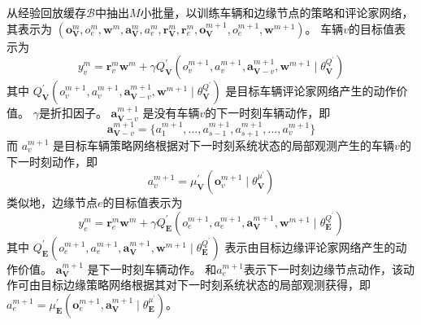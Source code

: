从经验回放缓存$\mathcal{B}$中抽出$M$小批量，以训练车辆和边缘节点的策略和评论家网络，其表示为 $\left(\boldsymbol{o}_{\mathbf{V}}^{m}, {o}_{e}^{m}, \boldsymbol{w}^{m}, \boldsymbol{a}_{\mathbf{V}}^{m}, {a}_{e}^{m}, \boldsymbol{r}_{\mathbf{V}}^{m}, \boldsymbol{r}_{e}^{m}, \boldsymbol{o}_{\mathbf{V}}^{m+1}, {o}_{e}^{m+1}, \boldsymbol{w}^{m+1}\right)$。
车辆$v$的目标值表示为
\begin{equation}
	y_{v}^{m} = \boldsymbol{r}_{v}^{m} \boldsymbol{w}^{m} +\gamma Q_{\mathbf{V}}^{\prime}\left({o}_{v}^{m+1},  {a}_{v}^{m+1}, \boldsymbol{a}_{\boldsymbol{\mathbf{V}}-v}^{m+1}, \boldsymbol{w}^{m+1} \mid \theta_{\mathbf{V}}^{Q^{\prime}} \right)
\end{equation}
\noindent 其中 $Q_{\mathbf{V}}^{\prime}({o}_{v}^{m+1},  {a}_{v}^{m+1}, \boldsymbol{a}_{\boldsymbol{\mathbf{V}}-v}^{m+1}, \boldsymbol{w}^{m+1} \mid \theta_{\mathbf{V}}^{Q^{\prime}})$ 是目标车辆评论家网络产生的动作价值。
$\gamma$是折扣因子。
$\boldsymbol{a}_{\boldsymbol{\mathbf{V}}-v}^{m+1}$ 是没有车辆$v$的下一时刻车辆动作，即
\begin{equation}
	\boldsymbol{a}_{\boldsymbol{\mathbf{V}}-v}^{m+1} = \{ {a}_{1}^{m+1}, \ldots, {a}_{s-1}^{m+1}, {a}_{s+1}^{m+1}, \ldots, {a}_{v}^{m+1} \}
\end{equation}
而 ${a}_{v}^{m+1}$ 是目标车辆策略网络根据对下一时刻系统状态的局部观测产生的车辆$v$的下一时刻动作，即
\begin{equation}
	{a}_{v}^{m+1} = \mu_{\mathbf{V}}^{\prime}(\boldsymbol{o}_{v}^{m+1} \mid \theta_{\mathbf{V}}^{\mu^{\prime}})
\end{equation}
类似地，边缘节点$e$的目标值表示为
\begin{equation}
	y_{e}^{m} = \boldsymbol{r}_{e}^{m} \boldsymbol{w}^{m} +\gamma Q_{\mathbf{E}}^{\prime}\left({o}_{e}^{m+1},  {a}_{e}^{m+1}, \boldsymbol{a}_{\boldsymbol{\mathbf{V}}}^{m+1}, \boldsymbol{w}^{m+1} \mid \theta_{\mathbf{E}}^{Q^{\prime}} \right)
\end{equation}
\noindent 其中 $Q_{\mathbf{E}}^{\prime}({o}_{e}^{m+1},  {a}_{e}^{m+1}, \boldsymbol{a}_{\boldsymbol{\mathbf{V}}}^{m+1}, \boldsymbol{w}^{m+1} \mid \theta_{\mathbf{E}}^{Q^{\prime}})$ 表示由目标边缘评论家网络产生的动作价值。
$\boldsymbol{a}_{\boldsymbol{\mathbf{V}}}^{m+1}$ 是下一时刻车辆动作。
和${a}_{e}^{m+1}$表示下一时刻边缘节点动作，该动作可由目标边缘策略网络根据其对下一时刻系统状态的局部观测获得，即${a}_{e}^{m+1} = \mu_{\mathbf{E}}^{\prime}(\boldsymbol{o}_{e}^{m+1}, \boldsymbol{a}_{\mathbf{V}}^{m+1} \mid \theta_{\mathbf{E}}^{\mu^{\prime}})$。

